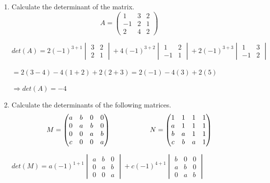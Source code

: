 \documentclass[fleqn]{article}
\begin{document}
  \begin{enumerate}
    \item  Calculate the determinant of the matrix. $$A = 
      \begin{pmatrix}
      1 & 3 & 2 \\
      -1 & 2 & 1 \\
      2 & 4 & 2
      \end{pmatrix} $$

      $det(A)=2(-1)^{3+1}
      \begin{vmatrix}
        3 & 2 \\
        2 & 1
      \end{vmatrix}
      +
      4(-1)^{3+2}
      \begin{vmatrix}
        1 & 2 \\
        -1 & 1
      \end{vmatrix}
      +
      2(-1)^{3+3}
      \begin{vmatrix}
        1 & 3 \\
        -1 & 2
      \end{vmatrix}
      $

      $
      = 2(3-4)-4(1+2)+2(2+3)
      = 2(-1)-4(3)+2(5)
      $

      $
      \Longrightarrow
      det(A)=-4
      $


    \item  Calculate the determinants of the following matrices. $$M = 
      \begin{pmatrix}
      a & b & 0 & 0 \\
      0 & a & b & 0 \\
      0 & 0 & a & b \\
      c & 0 & 0 & a
      \end{pmatrix} \hskip 2truecm
      N=\begin{pmatrix}
        1 & 1 & 1 & 1 \\
        a & 1 & 1 & 1 \\
        b &a & 1 & 1 \\
        c & b & a & 1
      \end{pmatrix}
      $$

      $
      det(M)=
      a(-1)^{1+1}
      \begin{vmatrix}
        a & b & 0 \\
        0 & a & b \\
        0 & 0 & a 
      \end{vmatrix}
      +
      c(-1)^{4+1}
      \begin{vmatrix}
        b & 0 & 0 \\
        a & b & 0 \\
        0 & a & b
      \end{vmatrix}
      $


\end{enumerate}
\end{document}
